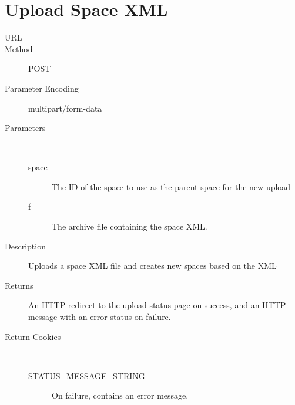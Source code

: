 \section{Upload Space XML}
\begin{description}
\item [URL] 
\item [Method] POST
\item [Parameter Encoding] multipart/form-data
\item [Parameters] \
	\begin{description}
	\item [space]  The ID of the space to use as the parent space for the new upload
	\item [f] \type{File} The archive file containing the space XML.
	\end{description}
\item [Description] Uploads a space XML file and creates new spaces based on the XML
\item [Returns] An HTTP redirect to the upload status page on success, and an HTTP message with an error status on failure.
\item [Return Cookies] \
	\begin{description}
	\item [STATUS\_MESSAGE\_STRING]  On failure, contains an error message.
    \end{description}
\end{description}

